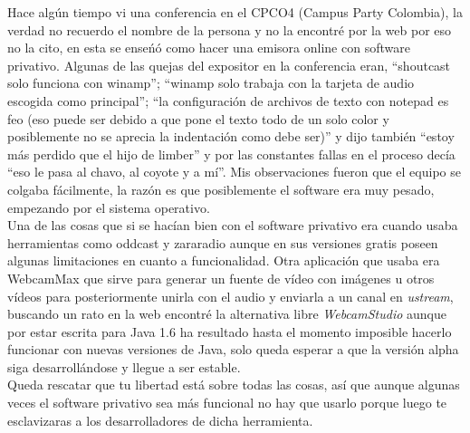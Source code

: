\begin{multicols}{2}
Hace algún tiempo vi una conferencia en el CPCO4 (Campus Party Colombia), la verdad no recuerdo el nombre de la persona y no la encontré por la web por eso no la cito, en esta se enseńó como hacer una emisora online con software privativo. Algunas de las quejas del expositor en la conferencia eran, ``shoutcast solo funciona con winamp''; ``winamp solo trabaja con la tarjeta de audio escogida como principal''; ``la configuración de archivos de texto con notepad es feo (eso puede ser debido a que pone el texto todo de un solo color y posiblemente no se aprecia la indentación como debe ser)'' y dijo también ``estoy más perdido que el hijo de limber'' y por las constantes fallas en el proceso decía ``eso le pasa al chavo, al coyote y a mí''. Mis observaciones fueron que el equipo se colgaba fácilmente, la razón es que posiblemente el software era muy pesado, empezando por el sistema operativo.\\

Una de las cosas que si se hacían bien con el software privativo era cuando usaba herramientas como oddcast y zararadio aunque en sus versiones gratis poseen algunas limitaciones en cuanto a funcionalidad. Otra aplicación que usaba era WebcamMax que sirve para generar un fuente de vídeo con imágenes u otros vídeos para posteriormente unirla con el audio y enviarla a un canal en {\em ustream}, buscando un rato en la web encontré la alternativa libre {\em WebcamStudio} aunque por estar escrita para Java 1.6 ha resultado hasta el momento imposible hacerlo funcionar con nuevas versiones de Java, solo queda esperar a que la versión alpha siga desarrollándose y llegue a ser estable.\\

Queda rescatar que tu libertad está sobre todas las cosas, así que aunque algunas veces el software privativo sea más funcional no hay que usarlo porque luego te esclavizaras a los desarrolladores de dicha herramienta.





\end{multicols}
